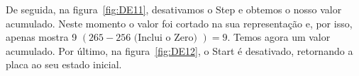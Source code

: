 De seguida, na figura~\ref{fig:DE11}, desativamos o Step e obtemos o nosso valor acumulado. Neste momento o valor foi cortado na sua representação e, por isso, apenas mostra 9 $(265 - 256 \text{ (Inclui o Zero) }) = 9$. Temos agora um valor acumulado. Por último, na figura~\ref{fig:DE12}, o Start é desativado, retornando a placa ao seu estado inicial.

\vspace*{\fill}%